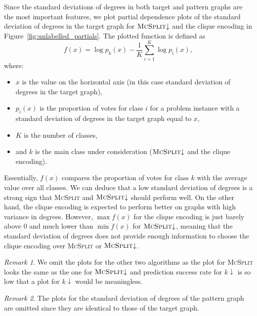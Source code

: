 \documentclass{l4proj}
\theoremstyle{definition}
\theoremstyle{remark}
\newtheorem{remark}{Remark}[chapter]
\begin{document}
Since the standard deviations of degrees in both target and pattern graphs are
the most important features, we plot partial dependence plots of the standard
deviation of degrees in the target graph for $\textsc{McSplit}{\downarrow}$ and
the clique encoding in Figure~\ref{fig:unlabelled_partials}. The plotted
function \cite{forest} is defined as
\[ f(x) = \log{p_k(x)} - \frac{1}{K} \sum_{i=1}^K \log{p_i(x)}, \]
where:

\begin{itemize}
\item $x$ is the value on the horizontal axis (in this case standard deviation of
  degrees in the target graph),
\item $p_i(x)$ is the proportion of votes for class $i$ for a problem instance
  with a standard deviation of degrees in the target graph equal to $x$,
\item $K$ is the number of classes,
\item and $k$ is the main class under consideration
  ($\textsc{McSplit}{\downarrow}$ and the clique encoding).
\end{itemize}

Essentially, $f(x)$ compares the proportion of votes for class $k$ with the
average value over all classes. We can deduce that a low standard deviation of
degrees is a strong sign that \textsc{McSplit} and $\textsc{McSplit}{\downarrow}$
should perform well. On the other hand, the clique encoding is expected to
perform better on graphs with high variance in degrees. However, $\max f(x)$ for
the clique encoding is just barely above 0 and much lower than $\min f(x)$ for
$\textsc{McSplit}{\downarrow}$, meaning that the standard deviation of degrees
does not provide enough information to choose the clique encoding over
\textsc{McSplit} or $\textsc{McSplit}{\downarrow}$.

\begin{remark}
  We omit the plots for the other two algorithms as the plot for \textsc{McSplit}
  looks the same as the one for $\textsc{McSplit}{\downarrow}$ and prediction success
  rate for $k{\downarrow}$ is so low that a plot for $k{\downarrow}$ would be
  meaningless.
\end{remark}

\begin{remark}
  The plots for the standard deviation of degrees of the pattern graph are
  omitted since they are identical to those of the target graph.
\end{remark}
\end{document}
